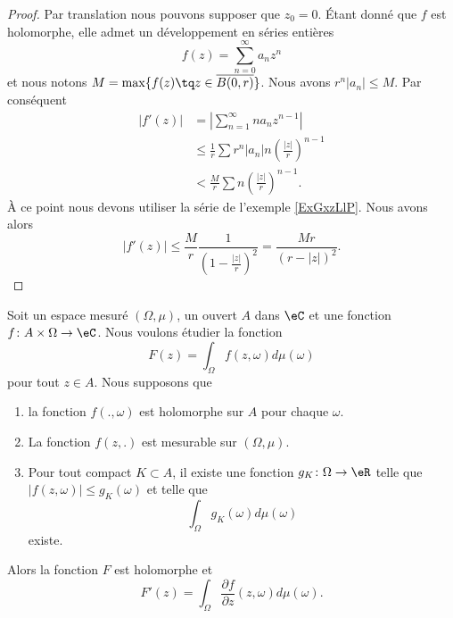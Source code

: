 \begin{proof}
    Par translation nous pouvons supposer que \( z_0=0\). Étant donné que \( f\) est holomorphe, elle admet un développement en séries entières
    \begin{equation}
        f(z)=\sum_{n=0}^{\infty}a_nz^n
    \end{equation}
    et nous notons \( M=\max\{ f(z)\tq z\in \overline{ B(0,r) } \}\). Nous avons \( r^n| a_n |\leq M\). Par conséquent
    \begin{subequations}
        \begin{align}
            | f'(z) |&=\left| \sum_{n=1}^{\infty}na_nz^{n-1} \right| \\
            &\leq\frac{1}{ r }\sum r^n| a_n |n\left( \frac{ | z | }{ r } \right)^{n-1}\\
            &<\frac{ M }{ r }\sum n\left( \frac{ | z | }{ r } \right)^{n-1}.
        \end{align}
    \end{subequations}
    À ce point nous devons utiliser la série de l'exemple \ref{ExGxzLlP}. Nous avons alors
    \begin{equation}
        | f'(z) |\leq \frac{ M }{ r }\frac{ 1 }{ \left( 1-\frac{ | z | }{ r } \right)^2 }=\frac{ Mr }{ (r-| z |)^2 }.
    \end{equation}
\end{proof}

\begin{theorem} \label{ThopCLOVN}
    Soit un espace mesuré \( (\Omega,\mu)\), un ouvert \( A\) dans \( \eC\) et une fonction \( f\colon A\times \Omega\to \eC\). Nous voulons étudier la fonction
    \begin{equation}
        F(z)=\int_{\Omega}f(z,\omega)d\mu(\omega)
    \end{equation}
    pour tout \( z\in A\). Nous supposons que
    \begin{enumerate}
        \item
            la fonction \( f(.,\omega)\) est holomorphe sur \( A\) pour chaque \( \omega\).
        \item
            La fonction \( f(z,.)\) est mesurable sur \( (\Omega,\mu)\).
        \item
            Pour tout compact \( K\subset A\), il existe une fonction \( g_K\colon \Omega\to \eR\) telle que \( | f(z,\omega) |\leq g_K(\omega)\) et telle que
            \begin{equation}
                \int_{\Omega}g_K(\omega)d\mu(\omega)
            \end{equation}
            existe.
    \end{enumerate}
    Alors la fonction \( F\) est holomorphe et
    \begin{equation}
        F'(z)=\int_{\Omega}\frac{ \partial f }{ \partial z }(z,\omega)d\mu(\omega).
    \end{equation}
\end{theorem}

